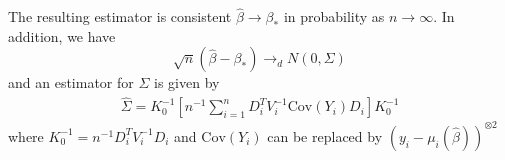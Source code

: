 \documentclass[12pt]{article}
\newcommand{\Cov}{\mathrm{Cov}}
\newcommand{\sumn}{\sum_{i=1}^n}
\newcommand{\bhat}{\hat{\beta}}
\numberwithin{equation}{section}
\begin{document}
The resulting estimator is consistent $\bhat \to \beta_*$ in probability as $n \to \infty$. In addition, we have
\begin{equation*}
  \sqrt{n}(\bhat - \beta_*) \to_d N(0, \Sigma)
\end{equation*}
and an estimator for $\Sigma$ is given by
\begin{align*}
  \hat{\Sigma} = K_0^{-1} 
  \left[ n^{-1} \sumn D_i^T V_i^{-1} \Cov(Y_i) D_i \right]
  K_0^{-1}
\end{align*}
where $K_0^{-1} = n^{-1} D_i^T V_i^{-1} D_i$ and $\Cov(Y_i)$ can be replaced by $(y_i - \mu_i(\bhat))^{\otimes 2}$
\end{document}

